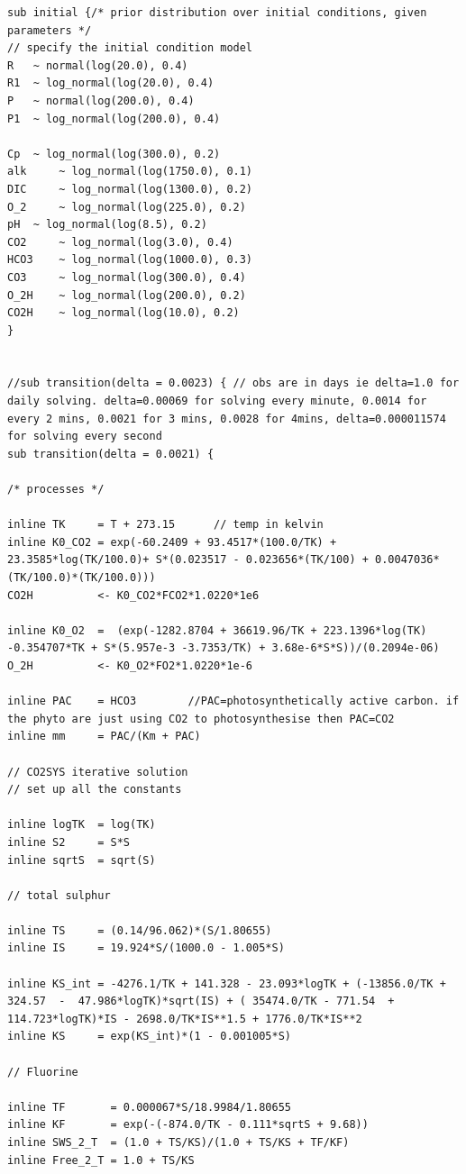 \documentclass{ruthesis}
\begin{document}
\begin{lstlisting}
sub initial {/* prior distribution over initial conditions, given parameters */
// specify the initial condition model 
R 	~ normal(log(20.0), 0.4)
R1 	~ log_normal(log(20.0), 0.4)
P 	~ normal(log(200.0), 0.4)
P1 	~ log_normal(log(200.0), 0.4)

Cp	~ log_normal(log(300.0), 0.2)	
alk 	~ log_normal(log(1750.0), 0.1)
DIC 	~ log_normal(log(1300.0), 0.2) 
O_2 	~ log_normal(log(225.0), 0.2)   
pH 	~ log_normal(log(8.5), 0.2)
CO2 	~ log_normal(log(3.0), 0.4)
HCO3 	~ log_normal(log(1000.0), 0.3)
CO3 	~ log_normal(log(300.0), 0.4)
O_2H 	~ log_normal(log(200.0), 0.2)	
CO2H 	~ log_normal(log(10.0), 0.2)
}


//sub transition(delta = 0.0023) { // obs are in days ie delta=1.0 for daily solving. delta=0.00069 for solving every minute, 0.0014 for every 2 mins, 0.0021 for 3 mins, 0.0028 for 4mins, delta=0.000011574 for solving every second
sub transition(delta = 0.0021) { 

/* processes */

inline TK     = T + 273.15		// temp in kelvin
inline K0_CO2 = exp(-60.2409 + 93.4517*(100.0/TK) + 23.3585*log(TK/100.0)+ S*(0.023517 - 0.023656*(TK/100) + 0.0047036*(TK/100.0)*(TK/100.0)))
CO2H          <- K0_CO2*FCO2*1.0220*1e6

inline K0_O2  =  (exp(-1282.8704 + 36619.96/TK + 223.1396*log(TK) -0.354707*TK + S*(5.957e-3 -3.7353/TK) + 3.68e-6*S*S))/(0.2094e-06)
O_2H 	      <- K0_O2*FO2*1.0220*1e-6

inline PAC    = HCO3  		//PAC=photosynthetically active carbon. if the phyto are just using CO2 to photosynthesise then PAC=CO2
inline mm     = PAC/(Km + PAC)

// CO2SYS iterative solution
// set up all the constants

inline logTK  = log(TK)
inline S2     = S*S
inline sqrtS  = sqrt(S)

// total sulphur

inline TS     = (0.14/96.062)*(S/1.80655)
inline IS     = 19.924*S/(1000.0 - 1.005*S)

inline KS_int = -4276.1/TK + 141.328 - 23.093*logTK + (-13856.0/TK + 324.57  -  47.986*logTK)*sqrt(IS) + ( 35474.0/TK - 771.54  + 114.723*logTK)*IS - 2698.0/TK*IS**1.5 + 1776.0/TK*IS**2
inline KS     = exp(KS_int)*(1 - 0.001005*S)

// Fluorine

inline TF       = 0.000067*S/18.9984/1.80655
inline KF       = exp(-(-874.0/TK - 0.111*sqrtS + 9.68))
inline SWS_2_T  = (1.0 + TS/KS)/(1.0 + TS/KS + TF/KF)
inline Free_2_T = 1.0 + TS/KS


\end{lstlisting}
\end{document}
